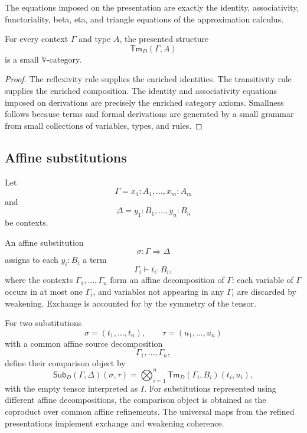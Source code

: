 The equations imposed on the presentation are exactly the identity,
associativity, functoriality, beta, eta, and triangle equations of the
approximation calculus.

\begin{lemma}
\label{lem:term-categories-are-V-categories}
For every context \(\Gamma\) and type \(A\), the presented structure
\[
    \mathsf{Tm}_D(\Gamma,A)
\]
is a small \(\mathbb V\)-category.
\end{lemma}

\begin{proof}
The reflexivity rule supplies the enriched identities.  The transitivity rule
supplies the enriched composition.  The identity and associativity equations
imposed on derivations are precisely the enriched category axioms.  Smallness
follows because terms and formal derivations are generated by a small grammar
from small collections of variables, types, and rules.
\end{proof}

\subsection{Affine substitutions}
\label{subsec:affine-substitutions}

Let
\[
    \Gamma=x_1:A_1,\dots,x_m:A_m
\]
and
\[
    \Delta=y_1:B_1,\dots,y_n:B_n
\]
be contexts.

An affine substitution
\[
    \sigma:\Gamma\Rightarrow\Delta
\]
assigns to each \(y_i:B_i\) a term
\[
    \Gamma_i\vdash t_i:B_i,
\]
where the contexts \(\Gamma_1,\dots,\Gamma_n\) form an affine decomposition
of \(\Gamma\): each variable of \(\Gamma\) occurs in at most one \(\Gamma_i\),
and variables not appearing in any \(\Gamma_i\) are discarded by weakening.
Exchange is accounted for by the symmetry of the tensor.

For two substitutions
\[
    \sigma=(t_1,\dots,t_n),
    \qquad
    \tau=(u_1,\dots,u_n)
\]
with a common affine source decomposition
\[
    \Gamma_1,\dots,\Gamma_n,
\]
define their comparison object by
\[
    \mathsf{Sub}_D(\Gamma,\Delta)(\sigma,\tau)
    =
    \bigotimes_{i=1}^n
    \mathsf{Tm}_D(\Gamma_i,B_i)(t_i,u_i),
\]
with the empty tensor interpreted as \(I\).  For substitutions represented
using different affine decompositions, the comparison object is obtained as
the coproduct over common affine refinements.  The universal maps from the
refined presentations implement exchange and weakening coherence.

